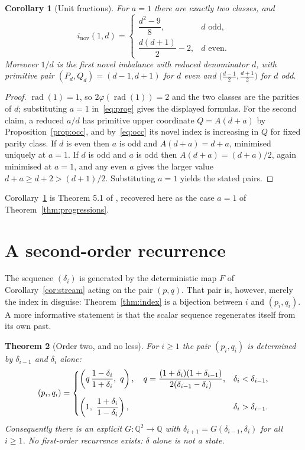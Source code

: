 \documentclass[11pt,a4paper]{article}
\theoremstyle{plain}
\newtheorem{theorem}{Theorem}[section]
\newtheorem{corollary}[theorem]{Corollary}
\theoremstyle{definition}
\theoremstyle{remark}
\DeclareMathOperator{\rad}{rad}
\newcommand{\Q}{\mathbb{Q}}
\begin{document}
\begin{corollary}[Unit fractions]\label{cor:unit}
For $a = 1$ there are exactly two classes, and
\[
  i_{\mathrm{nov}}(1,d) =
  \begin{cases} \dfrac{d^2-9}{8}, & d \text{ odd},\\[6pt]
                \dfrac{d(d+1)}{2} - 2, & d \text{ even}.\end{cases}
\]
Moreover $1/d$ is the first novel imbalance with reduced denominator $d$, with
primitive pair $(P_d,Q_d) = (d-1,d+1)$ for $d$ even and
$\bigl(\tfrac{d-1}{2},\tfrac{d+1}{2}\bigr)$ for $d$ odd.
\end{corollary}

\begin{proof}
$\rad(1) = 1$, so $2\varphi(\rad(1)) = 2$ and the two classes are the parities of
$d$; substituting $a=1$ in~\eqref{eq:prog} gives the displayed formulas. For the
second claim, a reduced $a/d$ has primitive upper coordinate $Q = A(d+a)$ by
Proposition~\ref{prop:occ}, and by~\eqref{eq:occ} its novel index is increasing
in $Q$ for fixed parity class. If $d$ is even then $a$ is odd and
$A(d+a) = d+a$, minimised uniquely at $a=1$. If $d$ is odd and $a$ is odd then
$A(d+a) = (d+a)/2$, again minimised at $a=1$, and any even $a$ gives the larger
value $d+a \ge d+2 > (d+1)/2$. Substituting $a=1$ yields the stated pairs.
\end{proof}

Corollary~\ref{cor:unit} is Theorem 5.1 of \cite{Bilokon2025}, recovered here as
the case $a = 1$ of Theorem~\ref{thm:progressions}.

\section{A second-order recurrence}
\label{sec:recurrence}

The sequence $(\delta_i)$ is generated by the deterministic map $F$ of
Corollary~\ref{cor:stream} acting on the pair $(p,q)$. That pair is, however,
merely the index in disguise: Theorem~\ref{thm:index} is a bijection between $i$
and $(p_i, q_i)$. A more informative statement is that the scalar sequence
regenerates itself from its own past.

\begin{theorem}[Order two, and no less]\label{thm:order2}
For $i \ge 1$ the pair $(p_i, q_i)$ is determined by $\delta_{i-1}$ and
$\delta_i$ alone:
\begin{equation}\label{eq:recover}
  (p_i, q_i) =
  \begin{dcases}
    \left( q\,\frac{1-\delta_i}{1+\delta_i},\ q \right),\quad
      q = \frac{(1+\delta_i)(1+\delta_{i-1})}{2(\delta_{i-1}-\delta_i)},
      & \delta_i < \delta_{i-1},\\[6pt]
    \left( 1,\ \frac{1+\delta_i}{1-\delta_i} \right), & \delta_i > \delta_{i-1}.
  \end{dcases}
\end{equation}
Consequently there is an explicit $G : \Q^2 \to \Q$ with
$\delta_{i+1} = G(\delta_{i-1}, \delta_i)$ for all $i \ge 1$. No first-order
recurrence exists: $\delta$ alone is not a state.
\end{theorem}
\end{document}
